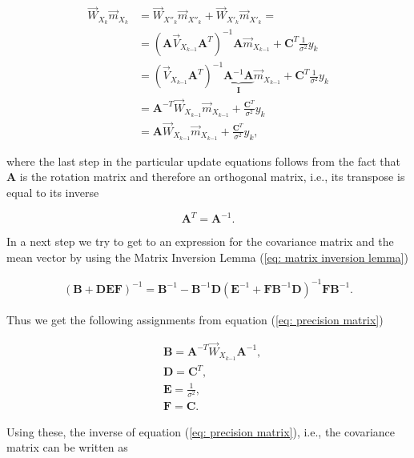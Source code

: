 \documentclass[11pt,a4paper,twoside]{report}
\newcommand{\messF}[3]{\overrightarrow{#1}_{{#2}_{k{#3}}}}
\newcommand{\mat}[1]{\mathbf{#1}}
\begin{document}
\begin{align}
  \label{eq: weighted mean}
  \messF{W}{X}{}\messF{m}{X}{} &= \messF{W}{X''}{}\messF{m}{X''}{} + \messF{W}{X'}{}\messF{m}{X'}{} = \\
  &= \left(\mat{A}\messF{V}{X}{-1}\mat{A}^T\right)^{-1}\mat{A}\messF{m}{X}{-1} + \mat{C}^T\frac{1}{\sigma^2}y_k \\
  &= \left(\messF{V}{X}{-1}\mat{A}^T\right)^{-1}\underbrace{\mat{A}^{-1}\mat{A}}_{\mat{I}}\messF{m}{X}{-1} + \mat{C}^T\frac{1}{\sigma^2}y_k \\
  &= \mat{A}^{-T}\messF{W}{X}{-1}\messF{m}{X}{-1} + \frac{\mat{C}^T}{\sigma^2}y_k \\
  &= \mat{A}\messF{W}{X}{-1}\messF{m}{X}{-1} + \frac{\mat{C}^T}{\sigma^2}y_k,
\end{align}

where the last step in the particular update equations follows from the fact that $\mat{A}$ is the rotation matrix and therefore an orthogonal matrix, i.e., its transpose is equal to its inverse

\begin{equation*}
	\mat{A}^T = \mat{A}^{-1}.
\end{equation*}

In a next step we try to get to an expression for the covariance matrix and the mean vector by using the Matrix Inversion Lemma (\ref{eq: matrix inversion lemma})
 
\begin{align}
	\label{eq: matrix inversion lemma}
	\left(\mat{B} + \mat{DEF}\right)^{-1} = \mat{B}^{-1} - \mat{B}^{-1}\mat{D}\left(\mat{E}^{-1} + \mat{F}\mat{B}^{-1}\mat{D}\right)^{-1}\mat{F}\mat{B}^{-1}.
\end{align}

\noindent Thus we get the following assignments from equation (\ref{eq: precision matrix})

\begin{align}
	\label{eq: assignments MIL}
	& \mat{B} = \mat{A}^{-T}\messF{W}{X}{-1}\mat{A}^{-1}, \\
	& \mat{D} = \mat{C}^T, \\
	& \mat{E} = \frac{1}{\sigma^2}, \\
	& \mat{F} = \mat{C}.
\end{align}

Using these, the inverse of equation (\ref{eq: precision matrix}), i.e., the covariance matrix can be written as
\end{document}
